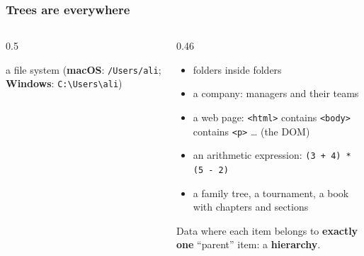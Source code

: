 \documentclass[aspectratio=169,10pt,compress]{beamer}
\newcommand{\win}{\textbf{Windows}}
\newcommand{\mac}{\textbf{macOS}}
\begin{document}
\begin{frame}[t,fragile] \frametitle{Trees are everywhere}
  \begin{columns}[T]
    \begin{column}{0.5\textwidth}
      \begin{center}

      \small a file system (\mac: \texttt{/Users/ali}; \win: \texttt{C:\textbackslash Users\textbackslash ali})
      \end{center}
    \end{column}
    \begin{column}{0.46\textwidth}
      \begin{itemize}\small
        \item folders inside folders
        \item a company: managers and their teams
        \item a web page: \texttt{<html>} contains \texttt{<body>} contains \texttt{<p>} \dots{} (the DOM)
        \item an arithmetic expression: \texttt{(3 + 4) * (5 - 2)}
        \item a family tree, a tournament, a book with chapters and sections
      \end{itemize}
      \vspace{0.3em}
      \small Data where each item belongs to \textbf{exactly one} ``parent'' item: a \textbf{hierarchy}.
    \end{column}
  \end{columns}
\end{frame}
\end{document}

